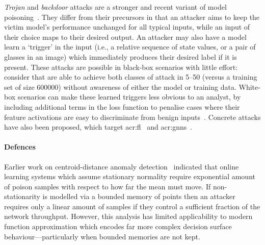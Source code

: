 \emph{Trojan} and \emph{backdoor} attacks are a stronger and recent variant of model poisoning~\parencite{DBLP:journals/corr/abs-1712-05526}.
They differ from their precursors in that an attacker aims to keep the victim model's performance unchanged for all typical inputs, while an input of their choice maps to their desired output.
An attacker may also have a model learn a `trigger' in the input (i.e., a relative sequence of state values, or a pair of glasses in an image) which immediately produces their desired label if it is present.
These attacks are possible in black-box scenarios with little effort: consider that \citeauthor{DBLP:journals/corr/abs-1712-05526} are able to achieve both classes of attack in \numrange{5}{50} (versus a training set of size \num{600000}) without awareness of either the model or training data.
White-box scenarios can make these learned triggers less obvious to an analyst, by including additional terms in the loss function to penalise cases where their feature activations are easy to discriminate from benign inputs~\parencite{DBLP:conf/eurosp/TanS20}.
Concrete attacks have also been proposed, which target \gls{acr:fl}~\parencite{DBLP:conf/aistats/BagdasaryanVHES20} and \glspl{acr:gnn}~\parencite{DBLP:conf/uss/XiPJ021}.

\paragraph{Defences}
Earlier work on centroid-distance anomaly detection~\parencite{DBLP:journals/jmlr/KloftL10} indicated that online learning systems which assume stationary normality require exponential amount of poison samples with respect to how far the mean must move.
If non-stationarity is modelled via a bounded memory of points then an attacker requires only a linear amount of samples if they control a sufficient fraction of the network throughput.
However, this analysis has limited applicability to modern function approximation which encodes far more complex decision surface behaviour---particularly when bounded memories are not kept.

